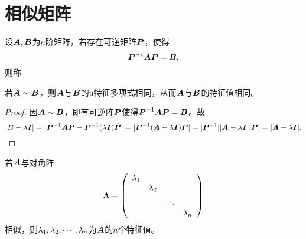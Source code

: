 \section{相似矩阵}

\begin{frame}[fragile]\ft{\secname}
\begin{dingyi}
  设$\A,\B$为$n$阶矩阵，若存在可逆矩阵$\PP$，使得
  $$
  \PP^{-1}\A\PP=\B,
  $$
  则称
\end{dingyi}
\end{frame}

\begin{frame}[fragile]\ft{\secname}
\begin{dingli}
若$\A\sim \B$，则$\A$与$\B$的u特征多项式相同，从而$\A$与$\B$的特征值相同。
\end{dingli}
\end{frame}

\begin{frame}[fragile]\ft{\secname}
\begin{proof}
  因$\A\sim\B$，即有可逆阵$\PP$使得$\PP^{-1}\A\PP=\B$。故
  $$
  |B-\lambda \II|=|\PP^{-1}\A\PP-\PP^{-1}(\lambda \II)\PP|=|\PP^{-1}(\A-\lambda \II)\PP|=|\PP^{-1}||\A-\lambda \II||\PP|=|\A-\lambda \II|.
  $$
\end{proof}

\end{frame}

\begin{frame}[fragile]\ft{\secname}
\begin{tuilun}
  若$\A$与对角阵
  $$
  \Lambdabd=\left(
    \begin{array}{cccc}
      \lambda_1&&&\\
               &\lambda_2&&\\
               &&\dd&\\
               &&&\lambda_n
    \end{array}
  \right)
  $$
  相似，则$\lambda_1,\lambda_2,\cd,\lambda_n$为$\A$的$n$个特征值。
\end{tuilun}
\end{frame}